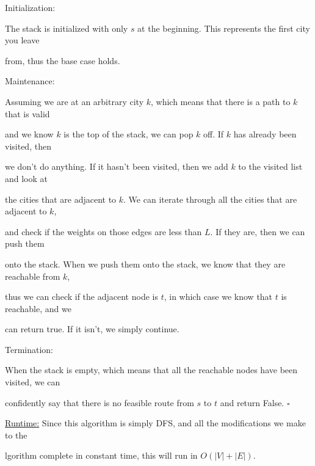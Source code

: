 \documentclass{article} %
\begin{document}
    Initialization: 

    \hspace{5pt} The stack is initialized with only $s$ at the beginning. This represents the first city you leave 
    
    \hspace{5pt} from, thus the base case holds.

    Maintenance:

    \hspace{5pt} Assuming we are at an arbitrary city $k$, which means that there is a path to $k$ that is valid 
    
    \hspace{5pt} and we know $k$ is the top of the stack, we can pop $k$ off. If $k$ has already been visited, then 
    
    \hspace{5pt} we don't do anything. If it hasn't been visited, then we add $k$ to the visited list and look at 
    
    \hspace{5pt} the cities that are adjacent to $k$. We can iterate through all the cities that are adjacent to $k$, 
    
    \hspace{5pt} and check if the weights on those edges are less than $L$. If they are, then we can push them 
    
    \hspace{5pt} onto the stack. When we push them onto the stack, we know that they are reachable from $k$, 
    
    \hspace{5pt} thus we can check if the adjacent node is $t$, in which case we know that $t$ is reachable, and we 
    
    \hspace{5pt} can return true. If it isn't, we simply continue.

    Termination:

    \hspace{5pt} When the stack is empty, which means that all the reachable nodes have been visited, we can 
    
    \hspace{5pt} confidently say that there is no feasible route from $s$ to $t$ and return False. $\square$

    \underline{Runtime:} Since this algorithm is simply DFS, and all the modifications we make to the 
    
    lgorithm complete in constant time, this will run in $O(|V| + |E|)$.
\end{document}
